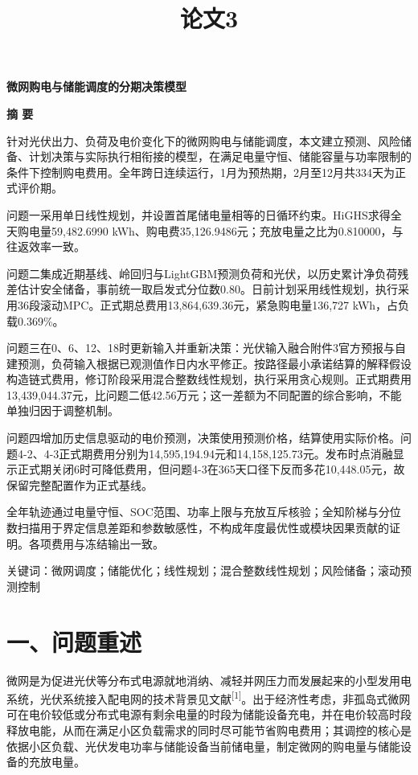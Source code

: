 \documentclass[12pt,a4paper]{ctexart}
\title{论文3}
\date{}
\begin{document}
\setlength{\abovedisplayskip}{6pt}
\setlength{\belowdisplayskip}{6pt}

\begin{center}\Large\bfseries 微网购电与储能调度的分期决策模型\end{center}

\begin{center}\Large\bfseries 摘 要\end{center}

针对光伏出力、负荷及电价变化下的微网购电与储能调度，本文建立预测、风险储备、计划决策与实际执行相衔接的模型，在满足电量守恒、储能容量与功率限制的条件下控制购电费用。全年跨日连续运行，1月为预热期，2月至12月共334天为正式评价期。

问题一采用单日线性规划，并设置首尾储电量相等的日循环约束。HiGHS求得全天购电量59,482.6990 kWh、购电费35,126.9486元；充放电量之比为0.810000，与往返效率一致。

问题二集成近期基线、岭回归与LightGBM预测负荷和光伏，以历史累计净负荷残差估计安全储备，事前统一取启发式分位数0.80。日前计划采用线性规划，执行采用36段滚动MPC。正式期总费用13,864,639.36元，紧急购电量136,727 kWh，占负载0.369\%。

问题三在0、6、12、18时更新输入并重新决策：光伏输入融合附件3官方预报与自建预测，负荷输入根据已观测值作日内水平修正。按路径最小承诺结算的解释假设构造链式费用，修订阶段采用混合整数线性规划，执行采用贪心规则。正式期费用13,439,044.37元，比问题二低42.56万元；这一差额为不同配置的综合影响，不能单独归因于调整机制。

问题四增加历史信息驱动的电价预测，决策使用预测价格，结算使用实际价格。问题4-2、4-3正式期费用分别为14,595,194.94元和14,158,125.73元。发布时点消融显示正式期关闭6时可降低费用，但问题4-3在365天口径下反而多花10,448.05元，故保留完整配置作为正式基线。

全年轨迹通过电量守恒、SOC范围、功率上限与充放互斥核验；全知阶梯与分位数扫描用于界定信息差距和参数敏感性，不构成年度最优性或模块因果贡献的证明。各项费用与冻结输出一致。

关键词：微网调度；储能优化；线性规划；混合整数线性规划；风险储备；滚动预测控制

\clearpage

\section*{一、问题重述}

微网是为促进光伏等分布式电源就地消纳、减轻并网压力而发展起来的小型发用电系统，光伏系统接入配电网的技术背景见文献\textsuperscript{[1]}。出于经济性考虑，非孤岛式微网可在电价较低或分布式电源有剩余电量的时段为储能设备充电，并在电价较高时段释放电能，从而在满足小区负载需求的同时尽可能节省购电费用；其调控的核心是依据小区负载、光伏发电功率与储能设备当前储电量，制定微网的购电量与储能设备的充放电量。
\end{document}
